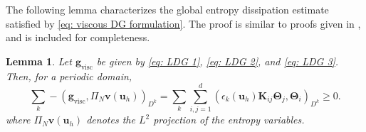 \documentclass{elsarticle}
\theoremstyle{definition}
\theoremstyle{plain}
\newtheorem{lemma}{Lemma}
\theoremstyle{plain}
\begin{document}
The following lemma characterizes the global entropy dissipation estimate satisfied by \eqref{eq: viscous DG formulation}. The proof is similar to proofs given in \cite{chan2025artificial, chan2022entropy}, and is included for completeness.
\begin{lemma}
\label{lemma:ldg_dissipation}
    Let $\bm{g}_{\text{visc}}$ be given by \eqref{eq: LDG 1}, \eqref{eq: LDG 2}, and \eqref{eq: LDG 3}. Then, for a periodic domain,
    \begin{equation*}
        \sum_k -\left(\bm{g}_{\text{visc}}, \Pi_N \bm{v}(\bm{u}_h) \right)_{D^k} = \sum_k\sum_{i,j = 1}^d \left(\epsilon_k(\bm{u}_h)\bm{K}_{ij}\bm{\Theta}_j,\bm{\Theta}_i \right)_{D^k} \geq 0.   \end{equation*}
        where $\Pi_N\bm{v}(\bm{u}_h)$ denotes the $L^2$ projection of the entropy variables.
\end{lemma}
%
\end{document}
